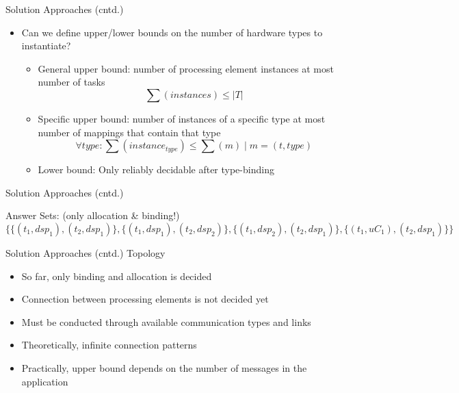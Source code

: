 \documentclass[11pt]{beamer}
\begin{document}
\begin{frame}{Solution Approaches (cntd.)}
  \label{slide:bounds}
  \begin{itemize} 
    \item Can we define upper/lower bounds on the number of hardware types to instantiate?
    \begin{itemize}
      \item General upper bound: number of processing element instances at most number of tasks \[\sum(instances)\leq \vert T\vert\]
      \item Specific upper bound: number of instances of a specific type at most number of mappings that contain that type \[\forall type: \sum(instance_{type}) \leq \sum(m)\mid m=(t, type)\]
      \item Lower bound: Only reliably decidable after type-binding
    \end{itemize}
  \end{itemize}
\end{frame}

\begin{frame}[fragile]{Solution Approaches (cntd.)}

  {\tiny}
   Answer Sets: (only allocation \& binding!)
  {\tiny
  \[\{\{(t_1,dsp_1),(t_2,dsp_1)\},\{(t_1,dsp_1),(t_2,dsp_2)\},\{(t_1,dsp_2),(t_2,dsp_1)\},\{(t_1,uC_1),(t_2,dsp_1)\}\}\]
  }
\end{frame}

\begin{frame}{Solution Approaches (cntd.)}
  Topology
  \begin{itemize}
    \item So far, only binding and allocation is decided
    \item Connection between processing elements is not decided yet
    \item Must be conducted through available communication types and links
    \item Theoretically, infinite connection patterns
    \item Practically, upper bound depends on the number of messages in the application
  \end{itemize}
\end{frame}
\end{document}
